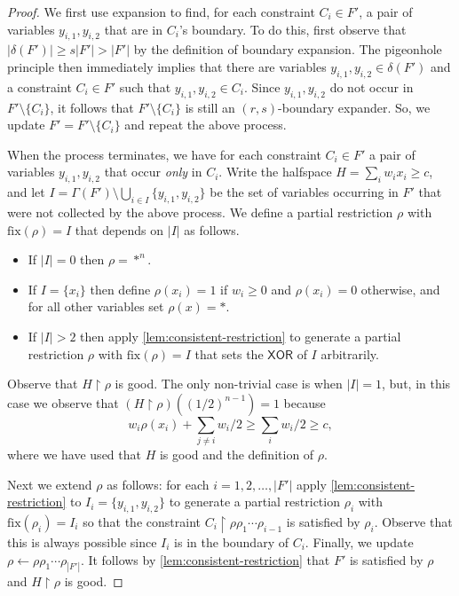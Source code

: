 \documentclass[11pt]{article}
\numberwithin{equation}{section}
\theoremstyle{definition}
\theoremstyle{plain}
\newcommand{\set}[1]{\{ #1 \}}
\renewcommand{\restriction}{\!\!\upharpoonright}
\newcommand{\fix}{\ensuremath{\mathrm{fix}}}
\newcommand{\XOR}{\ensuremath{\mathsf{XOR}}}
\renewcommand{\restriction}{\!\ensuremath{\upharpoonright}\!}
\begin{document}
\begin{proof}
	We first use expansion to find, for each constraint $C_i \in F'$, a pair of variables $y_{i,1}, y_{i,2}$ that are in $C_i$'s boundary. To do this, first observe that $|\delta(F')| \geq s |F'| > |F'|$ by the definition of boundary expansion.
	The pigeonhole principle then immediately implies that there are variables $y_{i,1}, y_{i,2} \in \delta(F')$ and a constraint $C_i \in F'$ such that $y_{i,1}, y_{i,2} \in C_i$. 
	Since $y_{i,1},y_{i,2}$ do not occur in $F' \setminus \{C_i\}$, it follows that $F' \setminus \{C_i\}$ is still an $(r, s)$-boundary expander. 
	So, we update $F' = F' \setminus \set{C_i}$ and repeat the above process.

	When the process terminates, we have for each constraint $C_i \in F'$ a pair of variables $y_{i,1}, y_{i,2}$ that occur \emph{only} in $C_i$.
	Write the halfspace $H = \sum_{i} w_i x_i \geq c$, and let $I = \Gamma(F') \setminus \bigcup_{i \in I} \set{y_{i,1}, y_{i,2}}$ be the set of variables occurring in $F'$ that were not collected by the above process.
	We define a partial restriction $\rho$ with $\fix(\rho) = I$ that depends on $|I|$ as follows.	
	\begin{itemize}
		\item If $|I| = 0$ then $\rho = *^n$.
		\item If $I = \set{x_i}$ then define $\rho(x_i) = 1$ if $w_i \geq 0$ and $\rho(x_i) = 0$ otherwise, and for all other variables set $\rho(x) = *$.
		\item If $|I| > 2$ then apply \autoref{lem:consistent-restriction} to generate a partial restriction $\rho$ with $\fix(\rho) = I$ that sets the $\XOR$ of $I$ arbitrarily.
	\end{itemize}
	Observe that $H \restriction \rho$ is good.
	The only non-trivial case is when $|I| = 1$, but, in this case we observe that $(H \restriction \rho)((1/2)^{n-1}) = 1$ because  
	 \[ w_i \rho(x_i) + \sum_{j \neq i} w_i/2 \geq \sum_{i} w_i/2 \geq c,\]
	where we have used that $H$ is good and the definition of $\rho$.

	Next we extend $\rho$ as follows: for each $i = 1, 2, \ldots, |F'|$ apply \autoref{lem:consistent-restriction} to $I_i = \set{y_{i,1}, y_{i,2}}$ to generate a partial restriction $\rho_i$ with $\fix(\rho_i) = I_i$ so that the constraint $C_i \restriction \rho \rho_1 \cdots \rho_{i-1}$ is satisfied by $\rho_i$.
	Observe that this is always possible since $I_i$ is in the boundary of $C_i$.
	Finally, we update $\rho \leftarrow \rho \rho_1 \cdots \rho_{|F'|}$.
	It follows by \autoref{lem:consistent-restriction} that $F'$ is satisfied by $\rho$ and $H \restriction \rho$ is good.
\end{proof}
\end{document}
